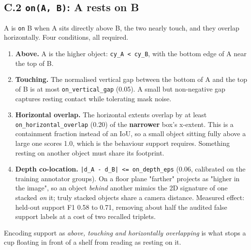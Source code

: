 \subsection{C.2 \texttt{on(A, B)}: A rests on B}

A is \texttt{on} B when A sits directly above B, the two nearly touch, and they overlap horizontally. Four conditions, all required.

\begin{enumerate}
\item \textbf{Above.} A is the higher object: \texttt{cy\_\allowbreak{}A < cy\_\allowbreak{}B}, with the bottom edge of A near the top of B.
\item \textbf{Touching.} The normalised vertical gap between the bottom of A and the top of B is at most \texttt{on\_\allowbreak{}vertical\_\allowbreak{}gap} (0.05). A small but non-negative gap captures resting contact while tolerating mask noise.
\item \textbf{Horizontal overlap.} The horizontal extents overlap by at least \texttt{on\_\allowbreak{}horizontal\_\allowbreak{}overlap} (0.20) of the \textbf{narrower} box's x-extent. This is a containment fraction instead of an IoU, so a small object sitting fully above a large one scores 1.0, which is the behaviour support requires. Something resting on another object must share its footprint.
\item \textbf{Depth co-location.} \texttt{|d\_\allowbreak{}A - d\_\allowbreak{}B| <= on\_\allowbreak{}depth\_\allowbreak{}eps} (0.06, calibrated on the training annotator groups). On a floor plane "farther" projects as "higher in the image", so an object \textit{behind} another mimics the 2D signature of one stacked \textit{on} it; truly stacked objects share a camera distance. Measured effect: held-out support F1 0.58 to 0.71, removing about half the audited false support labels at a cost of two recalled triplets.
\end{enumerate}

Encoding support as \textit{above, touching and horizontally overlapping} is what stops a cup floating in front of a shelf from reading as resting on it.


